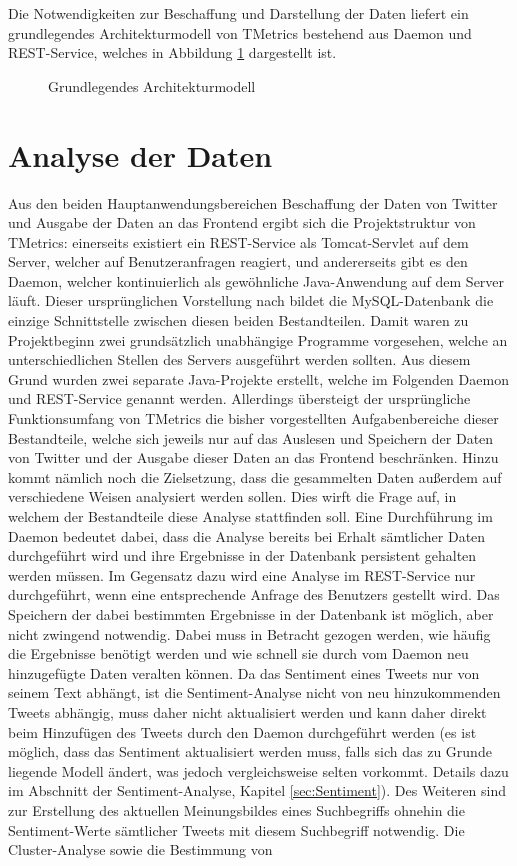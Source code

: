 Die Notwendigkeiten zur Beschaffung und Darstellung der Daten liefert ein grundlegendes Architekturmodell von TMetrics bestehend aus Daemon und REST-Service, welches in Abbildung \ref{arch2} dargestellt ist.

\begin{figure}[h]
\centering
\scalebox{0.7}{}
\caption{Grundlegendes Architekturmodell}
\label{arch2}
\end{figure}

\section{Analyse der Daten}

Aus den beiden Hauptanwendungsbereichen Beschaffung der Daten von Twitter und Ausgabe der Daten an das Frontend ergibt sich die Projektstruktur von TMetrics: einerseits existiert ein REST-Service als Tomcat-Servlet auf dem Server, welcher auf Benutzeranfragen reagiert, und andererseits gibt es den Daemon, welcher kontinuierlich als gewöhnliche Java-Anwendung auf dem Server läuft. Dieser ursprünglichen Vorstellung nach bildet die MySQL-Datenbank die einzige Schnittstelle zwischen diesen beiden Bestandteilen. Damit waren zu Projektbeginn zwei grundsätzlich unabhängige Programme vorgesehen, welche an unterschiedlichen Stellen des Servers ausgeführt werden sollten. Aus diesem Grund wurden zwei separate Java-Projekte erstellt, welche im Folgenden Daemon und REST-Service genannt werden. Allerdings übersteigt der ursprüngliche Funktionsumfang von TMetrics die bisher vorgestellten Aufgabenbereiche dieser Bestandteile, welche sich jeweils nur auf das Auslesen und Speichern der Daten von Twitter und der Ausgabe dieser Daten an das Frontend beschränken. Hinzu kommt nämlich noch die Zielsetzung, dass die gesammelten Daten außerdem auf verschiedene Weisen analysiert werden sollen. Dies wirft die Frage auf, in welchem der Bestandteile diese Analyse stattfinden soll. Eine Durchführung im Daemon bedeutet dabei, dass die Analyse bereits bei Erhalt sämtlicher Daten durchgeführt wird und ihre Ergebnisse in der Datenbank persistent gehalten werden müssen. Im Gegensatz dazu wird eine Analyse im REST-Service nur durchgeführt, wenn eine entsprechende Anfrage des Benutzers gestellt wird. Das Speichern der dabei bestimmten Ergebnisse in der Datenbank ist möglich, aber nicht zwingend notwendig. Dabei muss in Betracht gezogen werden, wie häufig die Ergebnisse benötigt werden und wie schnell sie durch vom Daemon neu hinzugefügte Daten veralten können. Da das Sentiment eines Tweets nur von seinem Text abhängt, ist die Sentiment-Analyse nicht von neu hinzukommenden Tweets abhängig, muss daher nicht aktualisiert werden und kann daher direkt beim Hinzufügen des Tweets durch den Daemon durchgeführt werden (es ist möglich, dass das Sentiment aktualisiert werden muss, falls sich das zu Grunde liegende Modell ändert, was jedoch vergleichsweise selten vorkommt. Details dazu im Abschnitt der Sentiment-Analyse, Kapitel \ref{sec:Sentiment}). Des Weiteren sind zur Erstellung des aktuellen Meinungsbildes eines Suchbegriffs ohnehin die Sentiment-Werte sämtlicher Tweets mit diesem Suchbegriff notwendig. Die Cluster-Analyse sowie die Bestimmung von 